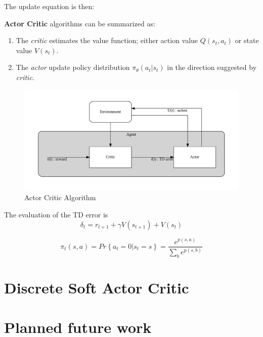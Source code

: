 \documentclass[8pt,oneside]{book}
\begin{document}
The update equation is then:


\textbf{Actor Critic} algorithms can be summarized as:

\begin{enumerate}
    \item The \emph{critic} estimates the value function; either
        action value $Q(s_t,a_t)$ or state value $V(s_t)$.
    \item The \emph{actor} update policy distribution $\pi_\theta(a_t|s_t)$
        in the direction suggested by \emph{critic}.
\end{enumerate}

\begin{figure}
    \center
    \caption{Actor Critic Algorithm}
    \includegraphics[scale=0.5]{actor_critic}
\end{figure}

The evaluation of the TD error is
\begin{equation}
    \delta_t = r_{t+1} + \gamma V(s_{t+1}) + V(s_t)
\end{equation}


\begin{equation}
    \pi_t(s,a) = Pr\left\lbrace a_t =0 | s_t =s \right\rbrace = \frac{e^{p(s,a)}}{\sum_b e^{p(s,b)}}
\end{equation}

\chapter{Discrete Soft Actor Critic}

\chapter{Planned future work}
\end{document}
